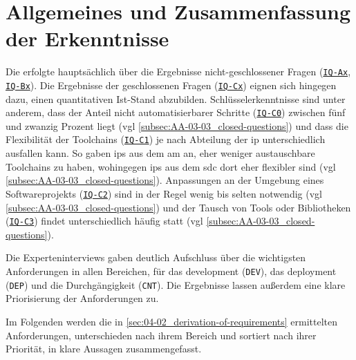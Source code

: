 \section{Allgemeines und Zusammenfassung der Erkenntnisse}
\label{sec:04-03_general-aspects-and-summery-of-findings}

Die  erfolgte hauptsächlich über die Ergebnisse nicht-geschlossener Fragen (\texttt{\hyperref[subsec:AA-01-01_open-questions]{IQ-Ax}}, \texttt{\hyperref[subsec:AA-01-02_half-open-questions]{IQ-Bx}}). Die Ergebnisse der geschlossenen Fragen (\texttt{\hyperref[subsec:AA-01-03_closed-questions]{IQ-Cx}}) eignen sich hingegen dazu, einen quantitativen Ist-Stand abzubilden. Schlüsselerkenntnisse sind unter anderem, dass der Anteil nicht automatisierbarer Schritte (\texttt{\hyperref[subsec:AA-01-03_closed-questions]{IQ-C0}}) zwischen fünf und zwanzig Prozent liegt (\acrshort{vgl} \autoref{subsec:AA-03-03_closed-questions}) und dass die Flexibilität der Toolchains (\texttt{\hyperref[subsec:AA-01-03_closed-questions]{IQ-C1}}) je nach Abteilung der \Gls{ip} unterschiedlich ausfallen kann. So gaben \Glspl{ip} aus dem \Gls{am} an, eher weniger austauschbare Toolchains zu haben, wohingegen \Glspl{ip} aus dem \Gls{sdc} dort eher flexibler sind (\acrshort{vgl} \autoref{subsec:AA-03-03_closed-questions}). Anpassungen an der Umgebung eines Softwareprojekts (\texttt{\hyperref[subsec:AA-01-03_closed-questions]{IQ-C2}}) sind in der Regel wenig bis selten notwendig (\acrshort{vgl} \autoref{subsec:AA-03-03_closed-questions}) und der Tausch von Tools oder Bibliotheken (\texttt{\hyperref[subsec:AA-01-03_closed-questions]{IQ-C3}}) findet unterschiedlich häufig statt (\acrshort{vgl} \autoref{subsec:AA-03-03_closed-questions}).

Die Experteninterviews gaben deutlich Aufschluss über die wichtigsten Anforderungen in allen Bereichen, für das \Gls{development} (\texttt{DEV}), das \Gls{deployment} (\texttt{DEP}) und die Durchgängigkeit (\texttt{CNT}). Die Ergebnisse lassen außerdem eine klare Priorisierung der Anforderungen zu.

Im Folgenden werden die in \autoref{sec:04-02_derivation-of-requirements} ermittelten Anforderungen, unterschieden nach ihrem Bereich und sortiert nach ihrer Priorität, in klare Aussagen zusammengefasst.

